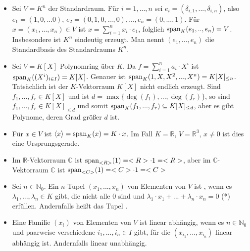 \begin{example}
	\begin{itemize}
		\item Sei $V=K^n$ der Standardraum. Für $i=1,...,n$ sei $e_i=(\delta_{i,1},...,\delta_{i,n})$, also $e_1=(1,0,...0)$, 
		$e_2=(0,1,0,...,0),...,e_n=(0,...,1)$. Für $x=(x_1,...,x_n) \in V$ ist $x=\sum_{i=1}^n x_i\cdot e_1$, folglich 
		$\operatorname{span}_K(e_1,..,e_n)=V$. Insbesondere ist $K^n$ eindeutig erzeugt. Man nennt $(e_1,...,e_n)$ die Standardbasis des 
		Standardraums $K^n$.
		\item Sei $V=K[X]$ Polynomring über $K$. Da $f=\sum_{i=1}^n a_i\cdot X^i$ ist $\operatorname{span}_K((X^i)_{i \in I})=K[X]$. 
		Genauer ist $\operatorname{span}_K(1,X,X^2,...,X^n)=K[X]_{\le n}$. Tatsächlich ist der $K$-Vektorraum $K[X]$ nicht endlich erzeugt. Sind 
		$f_1,...,f_r \in K[X]$ und ist $d=\max\{\deg(f_1),...,\deg(f_r)\}$, so sind $f_1,...,f_r \in K[X]_{\le d}$ und somit 
		$\operatorname{span}_K(f_1,...,f_r) \subseteq K[X]_{\le d}$, aber es gibt Polynome, deren Grad größer $d$ ist.
		\item Für $x \in V$ ist $\langle x\rangle=\operatorname{span}_K(x)=K\cdot x$. Im Fall $K=\mathbb R$, $V=\mathbb R^3$, $x\neq 0$ ist dies eine 
		Ursprungsgerade.
		\item Im $\mathbb R$-Vektorraum $\mathbb C$ ist $\operatorname{span}_{<R>}(1)=<R>\cdot 1=<R>$, aber im $\mathbb C$-Vektorraum 
		$\mathbb C$ ist $\operatorname{span}_{<C>}(1)=<C>\cdot 1=<C>$
	\end{itemize}
\end{example}

\begin{definition}
	\begin{itemize}
		\item Sei $n\in \mathbb N_0$. Ein $n$-Tupel $(x_1,...,x_n)$ von Elementen von $V$ ist , wenn es 
		$\lambda_1,...,\lambda_n \in K$ gibt, die nicht alle 0 sind und $\lambda_1\cdot x_1+...+\lambda_n\cdot x_n=0$ (*) 
		erfüllen. Andernfalls heißt das Tupel .
		\item Eine Familie $(x_i)$ von Elementen von $V$ ist linear abhängig, wenn es $n\in \mathbb N_0$ und paarweise 
		verschiedene $i_1,...,i_n \in I$ gibt, für die $(x_{i_1},...,x_{i_n})$ linear abhängig ist. Andernfalls linear 
		unabhängig.
	\end{itemize}
\end{definition}

